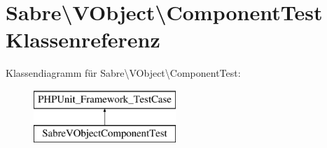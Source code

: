 \hypertarget{class_sabre_1_1_v_object_1_1_component_test}{}\section{Sabre\textbackslash{}V\+Object\textbackslash{}Component\+Test Klassenreferenz}
\label{class_sabre_1_1_v_object_1_1_component_test}
Klassendiagramm für Sabre\textbackslash{}V\+Object\textbackslash{}Component\+Test\+:\begin{figure}[H]
\begin{center}
\leavevmode
\includegraphics[height=2.000000cm]{class_sabre_1_1_v_object_1_1_component_test}
\end{center}
\end{figure}
